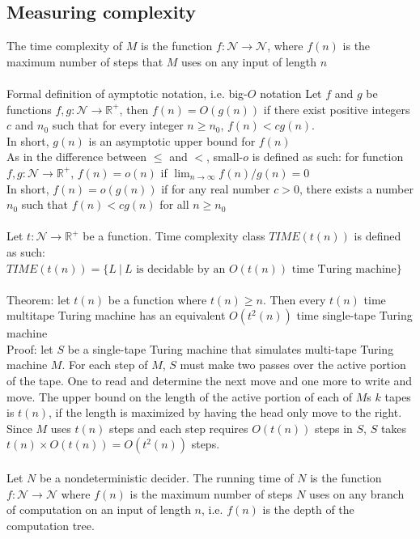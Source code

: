 \documentclass{article}
\newcommand*{\<}{\langle}
\renewcommand*{\>}{\rangle}
\begin{document}
		\subsection{Measuring complexity}
			The time complexity of $M$ is the function $f:\mathcal{N} \to \mathcal{N}$, where $f(n)$ is the maximum number of steps that $M$ uses on any input of length $n$ \\
			\\
			Formal definition of aymptotic notation, i.e. big-$O$ notation
			Let $f$ and $g$ be functions $f, g:\mathcal{N} \to \mathbb{R}^+$, then $f(n) = O(g(n))$ if there exist positive integers $c$ and $n_0$ such that for every integer $n \geq n_0$, $f(n) < cg(n)$. \\
			In short, $g(n)$ is an asymptotic upper bound for $f(n)$ \\
			As in the difference between $\leq$ and $<$, small-$o$ is defined as such: for function $f, g:\mathcal{N} \to \mathbb{R}^+$, $f(n) = o(n)$ if $\lim_{n \to \infty} f(n)/g(n) = 0$ \\
			In short, $f(n) = o(g(n))$ if for any real number $c > 0$, there exists a number $n_0$ such that $f(n) < cg(n)$ for all $n \geq n_0$ \\
			\\
			Let $t:\mathcal{N} \to \mathbb{R}^+$ be a function. Time complexity class $TIME(t(n))$ is defined as such: \\
			$TIME(t(n)) = \{L\:|\:L\text{ is decidable by an }O(t(n))\text{ time Turing machine}\}$ \\
			\\
			Theorem: let $t(n)$ be a function where $t(n) \geq n$. Then every $t(n)$ time multitape Turing machine has an equivalent $O(t^2(n))$ time single-tape Turing machine \\
			Proof: let $S$ be a single-tape Turing machine that simulates multi-tape Turing machine $M$. For each step of $M$, $S$ must make two passes over the active portion of the tape. One to read and determine the next move and one more to write and move. The upper bound on the length of the active portion of each of $M$s $k$ tapes is $t(n)$, if the length is maximized by having the head only move to the right. Since $M$ uses $t(n)$ steps and each step requires $O(t(n))$ steps in $S$, $S$ takes $t(n) \times O(t(n)) = O(t^2(n))$ steps. \\
			\\
			Let $N$ be a nondeterministic decider. The running time of $N$ is the function $f: \mathcal{N} \to \mathcal{N}$ where $f(n)$ is the maximum number of steps $N$ uses on any branch of computation on an input of length $n$, i.e. $f(n)$ is the depth of the computation tree. \\
\end{document}
